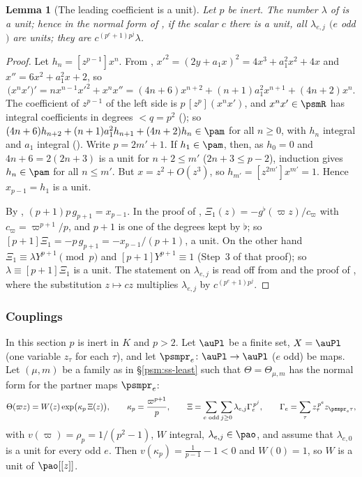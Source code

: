 \documentclass[10pt]{amsart}
\newtheorem{lemma}[theorem]{Lemma}
\theoremstyle{definition}
\theoremstyle{remark}
\begin{document}
\begin{lemma}[The leading coefficient is a unit]\label{psm:lambda}
Let $p$ be inert. The number $\lambda$ of {\cite[Theorem~4.9]{P49}} is a unit; hence in the normal
form of {\cite[Proposition~4.12]{P49}}, if the scalar $c$ there is a unit, all $\lambda_{e,j}$ $(e$
odd$)$ are units; they are $c^{(p^e+1)p^j}\lambda$.
\end{lemma}
\begin{proof}
Let $h_n=[z^{p-1}]x^n$. From {\cite[(25)]{P49}}, $x'^2=(2y+a_1x)^2=4x^3+a_1^2x^2+4x$ and
$x''=6x^2+a_1^2x+2$, so
\[
\bigl(x^nx'\bigr)'=nx^{n-1}x'^2+x^nx''=(4n+6)x^{n+2}+(n+1)a_1^2x^{n+1}+(4n+2)x^n .
\]
The coefficient of $z^{p-1}$ of the left side is $p\,[z^p](x^nx')$, and $x^nx'\in\psmR$ has integral
coefficients in degrees $<q=p^2$ ({\cite[Lemma~4.6(c)]{P49}}); so
$(4n+6)h_{n+2}+(n+1)a_1^2h_{n+1}+(4n+2)h_n\in\pam$ for all $n\ge0$, with $h_n$ integral and $a_1$
integral ({\cite[Lemma~4.5]{P49}}). Write $p=2m'+1$. If $h_1\in\pam$, then, as $h_0=0$ and
$4n+6=2(2n+3)$ is a unit for $n+2\le m'$ ($2n+3\le p-2$), induction gives $h_n\in\pam$ for all
$n\le m'$. But $x=z^2+O(z^3)$, so $h_{m'}=[z^{2m'}]x^{m'}=1$. Hence $x_{p-1}=h_1$ is a unit.

By {\cite[(28)]{P49}}, $(p+1)p\,g_{p+1}=x_{p-1}$. In the proof of {\cite[Theorem~4.9]{P49}},
$\Xi_1(z)=-g^\flat(\varpi z)/c_\varpi$ with $c_\varpi=\varpi^{p+1}/p$, and $p+1$ is one of the degrees
kept by $\flat$; so $[p+1]\Xi_1=-p\,g_{p+1}=-x_{p-1}/(p+1)$, a unit. On the other hand
$\Xi_1\equiv\lambda Y^{p+1}\pmod p$ and $[p+1]Y^{p+1}\equiv1$ (Step~3 of that proof); so
$\lambda\equiv[p+1]\Xi_1$ is a unit. The statement on $\lambda_{e,j}$ is read off from
{\cite[Theorem~4.9]{P49}} and the proof of {\cite[Proposition~4.12]{P49}}, where the substitution
$z\mapsto cz$ multiplies $\lambda_{e,j}$ by $c^{(p^e+1)p^j}$.
\end{proof}

\subsubsection{Couplings}\label{psm:ss-couplings}

In this section $p$ is inert in $K$ and $p>2$. Let $\auPl$ be a finite set, $X=\auPl$ (one
variable $z_\tau$ for each $\tau$), and let $\psmpr_e\colon\auPl\to\auPl$ ($e$ odd) be maps. Let
$(\mu,m)$ be a family as in \S\ref{psm:ss-least} such that $\Theta=\Theta_{\mu,m}$ has the normal
form {\cite[(20)]{P49}} for the partner maps $\psmpr_e$:
\[
\Theta(\varpi z)=W(z)\exp\bigl(\kappa_p\,\Xi(z)\bigr),\qquad\kappa_p=\frac{\varpi^{p+1}}p,\qquad
\Xi=\sum_{e\text{ odd}}\sum_{j\ge0}\lambda_{e,j}\Gamma_e^{\,p^j},\qquad\Gamma_e=\sum_\tau
z_\tau^{\,p^e}z_{\psmpr_e\tau},
\]
with $v(\varpi)=\rho_p=1/(p^2-1)$, $W$ integral, $\lambda_{e,j}\in\pao$, and assume that
$\lambda_{e,0}$ is a unit for every odd $e$. Then $v(\kappa_p)=\frac1{p-1}-1<0$ and $W(0)=1$, so
$W$ is a unit of $\pao[[z]]$.
\end{document}
